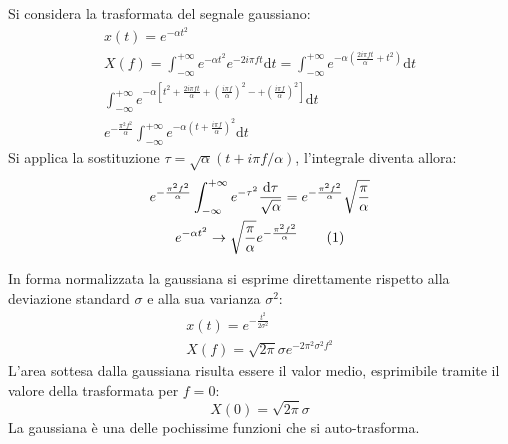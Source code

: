 \documentclass{article}
\newcommand{\df}{\mathrm{d}}
\newcommand{\tageq}{\tag{\stepcounter{equation}\theequation}}
\numberwithin{equation}{subsection}
\begin{document}
Si considera la trasformata del segnale gaussiano:
\begin{gather*}
    x(t)=e^{-\alpha t^2}\\
    X(f)=\displaystyle\int_{-\infty}^{+\infty}e^{-\alpha t^2}e^{-2i\pi ft}\df t=\int_{-\infty}^{+\infty}e^{-\alpha\left(\frac{2i\pi ft}{\alpha} + t^2\right)}\df t\\
    \displaystyle\int_{-\infty}^{+\infty}e^{-\alpha\left[t^2+\frac{2i\pi ft}{\alpha}+\left(\frac{i\pi f}{\alpha}\right)^2-+\left(\frac{i\pi f}{\alpha}\right)^2\right]}\df t\\
    e^{-\frac{\pi^2f^2}{\alpha}}\displaystyle\int_{-\infty}^{+\infty}e^{-\alpha\left(t+\frac{i\pi f}{\alpha}\right)^2}\df t
\end{gather*}
Si applica la sostituzione $\tau=\sqrt{\alpha}(t+i\pi f/\alpha)$, l'integrale diventa allora:
\begin{gather*}
    e^{-\frac{\pi^2f^2}{\alpha}}\displaystyle\int_{-\infty}^{+\infty}e^{-\tau^2}\frac{\df\tau}{\sqrt{\alpha}}=e^{-\frac{\pi^2f^2}{\alpha}}\sqrt{\frac{\pi}{\alpha}}\\
    e^{-\alpha t^2}\to \sqrt{\frac{\pi}{\alpha}}e^{-\frac{\pi^2f^2}{\alpha}}\tageq
\end{gather*}

In forma normalizzata la gaussiana si esprime direttamente rispetto alla deviazione standard $\sigma$ e alla sua varianza $\sigma^2$:
\begin{gather*}
    x(t)=e^{-\frac{t^2}{2\sigma^2}}\\
    X(f)=\sqrt{2\pi}\sigma e^{-2\pi^2\sigma^2f^2}
\end{gather*}
L'area sottesa dalla gaussiana risulta essere il valor medio, esprimibile tramite il valore della trasformata per $f=0$:
\begin{equation*}
    X(0)=\sqrt{2\pi}\sigma
\end{equation*}
La gaussiana è una delle pochissime funzioni che si auto-trasforma. 
\end{document}
